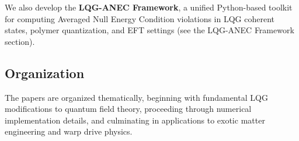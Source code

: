 \documentclass[11pt]{article}
\begin{document}
We also develop the \textbf{LQG-ANEC Framework}, a unified Python-based toolkit for computing Averaged Null Energy Condition violations in LQG coherent states, polymer quantization, and EFT settings (see the LQG-ANEC Framework section).

\subsection*{Organization}
The papers are organized thematically, beginning with fundamental LQG modifications to quantum field theory, proceeding through numerical implementation details, and culminating in applications to exotic matter engineering and warp drive physics.
\end{document}
